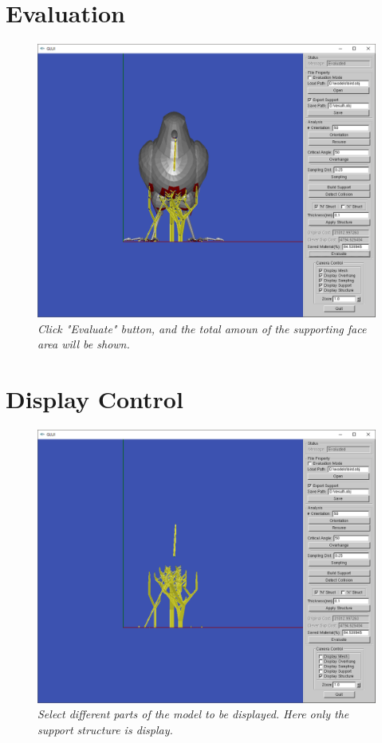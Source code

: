 \documentclass[11pt, a4paper]{article}
\begin{document}
	\section{Evaluation}
	\begin{figure}[H]
  		\centering
      	\includegraphics[width=1.0\textwidth]{evaluate.png}
  	\caption{\textit{Click "Evaluate" button, and the total amoun of the supporting face area will be shown.}}
	\end{figure}
	\section{Display Control}
	\begin{figure}[H]
  		\centering
      	\includegraphics[width=1.0\textwidth]{control.png}
  	\caption{\textit{Select different parts of the model to be displayed. Here only the support structure is display.}}
	\end{figure}
\end{document}
